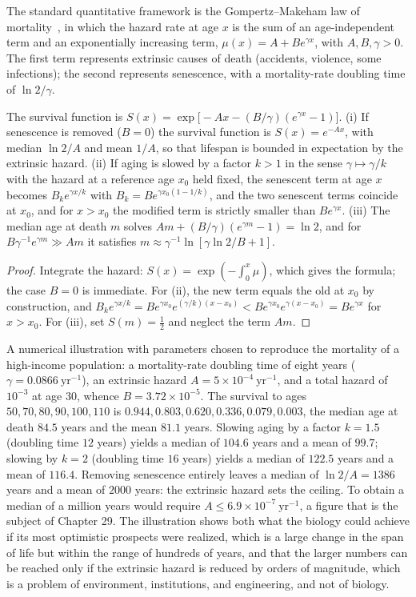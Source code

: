 The standard quantitative framework is the Gompertz--Makeham law of mortality~\cite{gompertz1825,makeham1860}, in which the hazard rate at age $x$ is the sum of an age-independent term and an exponentially increasing term, $\mu(x)=A+Be^{\gamma x}$, with $A,B,\gamma>0$. The first term represents extrinsic causes of death (accidents, violence, some infections); the second represents senescence, with a mortality-rate doubling time of $\ln2/\gamma$.

\begin{proposition}
The survival function is $S(x)=\exp\!\big[-Ax-(B/\gamma)(e^{\gamma x}-1)\big]$. (i) If senescence is removed ($B=0$) the survival function is $S(x)=e^{-Ax}$, with median $\ln2/A$ and mean $1/A$, so that lifespan is bounded in expectation by the extrinsic hazard. (ii) If aging is slowed by a factor $k>1$ in the sense $\gamma\mapsto\gamma/k$ with the hazard at a reference age $x_0$ held fixed, the senescent term at age $x$ becomes $B_ke^{\gamma x/k}$ with $B_k=Be^{\gamma x_0(1-1/k)}$, and the two senescent terms coincide at $x_0$, and for $x>x_0$ the modified term is strictly smaller than $Be^{\gamma x}$. (iii) The median age at death $m$ solves $Am+(B/\gamma)(e^{\gamma m}-1)=\ln2$, and for $B\gamma^{-1}e^{\gamma m}\gg Am$ it satisfies $m\approx\gamma^{-1}\ln[\gamma\ln2/B+1]$.
\end{proposition}

\begin{proof}
Integrate the hazard: $S(x)=\exp(-\int_0^x\mu)$, which gives the formula; the case $B=0$ is immediate. For (ii), the new term equals the old at $x_0$ by construction, and $B_ke^{\gamma x/k}=Be^{\gamma x_0}e^{(\gamma/k)(x-x_0)}<Be^{\gamma x_0}e^{\gamma(x-x_0)}=Be^{\gamma x}$ for $x>x_0$. For (iii), set $S(m)=\tfrac12$ and neglect the term $Am$.
\end{proof}

A numerical illustration with parameters chosen to reproduce the mortality of a high-income population: a mortality-rate doubling time of eight years ($\gamma=0.0866\ \mathrm{yr^{-1}}$), an extrinsic hazard $A=5\times10^{-4}\ \mathrm{yr^{-1}}$, and a total hazard of $10^{-3}$ at age 30, whence $B=3.72\times10^{-5}$. The survival to ages $50,70,80,90,100,110$ is $0.944,0.803,0.620,0.336,0.079,0.003$, the median age at death $84.5$ years and the mean $81.1$ years. Slowing aging by a factor $k=1.5$ (doubling time $12$ years) yields a median of $104.6$ years and a mean of $99.7$; slowing by $k=2$ (doubling time $16$ years) yields a median of $122.5$ years and a mean of $116.4$. Removing senescence entirely leaves a median of $\ln2/A=1386$ years and a mean of $2000$ years: the extrinsic hazard sets the ceiling. To obtain a median of a million years would require $A\le6.9\times10^{-7}\ \mathrm{yr^{-1}}$, a figure that is the subject of Chapter 29. The illustration shows both what the biology could achieve if its most optimistic prospects were realized, which is a large change in the span of life but within the range of hundreds of years, and that the larger numbers can be reached only if the extrinsic hazard is reduced by orders of magnitude, which is a problem of environment, institutions, and engineering, and not of biology.
